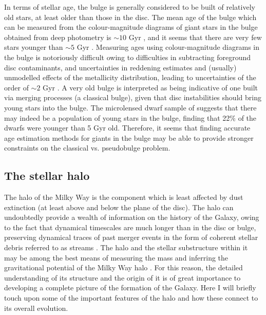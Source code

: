 In terms of stellar age, the bulge is generally considered to be built of relatively old stars, at least older than those in the disc. The mean age of the bulge which can be measured from the colour-magnitude diagrams of giant stars in the bulge obtained from deep photometry is $\sim 10$ Gyr \citep[e.g.][]{2003A&A...399..931Z,2013A&A...559A..98V}, and it seems that there are very few stars younger than $\sim 5$ Gyr \citep{2011ApJ...735...37C}. Measuring ages using colour-magnitude diagrams in the bulge is notoriously difficult owing to difficulties in subtracting foreground disc contaminants, and uncertainties in reddening estimates and (usually) unmodelled effects of the metallicity distribution, leading to uncertainties of the order of $\sim 2$ Gyr \citep{2016ASSL..418..199G}. A very old bulge is interpreted as being indicative of one built via merging processes (a classical bulge), given that disc instabilities should bring young stars into the bulge. The microlensed dwarf sample of \citet{2013A&A...549A.147B} suggests that there may indeed be a population of young stars in the bulge, finding that 22\% of the dwarfs were younger than 5 Gyr old. Therefore, it seems that finding accurate age estimation methods for giants in the bulge may be able to provide stronger constraints on the classical vs. pseudobulge problem.

\subsection{The stellar halo}
The halo of the Milky Way is the component which is least affected by dust extinction (at least above and below the plane of the disc). The halo can undoubtedly provide a wealth of information on the history of the Galaxy, owing to the fact that dynamical timescales are much longer than in the disc or bulge, preserving dynamical traces of past merger events in the form of coherent stellar debris referred to as streams \citep[e.g.][]{1996ApJ...465..278J}. The halo and the stellar substructure within it may be among the best means of measuring the mass and inferring the gravitational potential of the Milky Way halo \citep[e.g.][]{2014ApJ...794....4P}. For this reason, the detailed understanding of its structure and the origin of it is of great importance to developing a complete picture of the formation of the Galaxy. Here I will briefly touch upon some of the important features of the halo and how these connect to its overall evolution.

